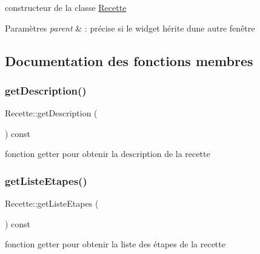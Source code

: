 constructeur de la classe \hyperlink{classRecette}{Recette} 


\begin{DoxyParams}{Paramètres}
{\em parent} & \+: précise si le widget hérite d\textquotesingle{}une autre fenêtre \\
\hline
\end{DoxyParams}


\subsection{Documentation des fonctions membres}
\mbox{\label{classRecette_a7f3746b691f39d1b468b29819ad3c265}} 
\subsubsection{\texorpdfstring{get\+Description()}{getDescription()}}
{\footnotesize\ttfamily Recette\+::get\+Description (\begin{DoxyParamCaption}{ }\end{DoxyParamCaption}) const}



fonction getter pour obtenir la description de la recette 

\mbox{\label{classRecette_a3b2807fe1f55431bcd632bff2332c6e7}} 
\subsubsection{\texorpdfstring{get\+Liste\+Etapes()}{getListeEtapes()}}
{\footnotesize\ttfamily Recette\+::get\+Liste\+Etapes (\begin{DoxyParamCaption}{ }\end{DoxyParamCaption}) const}



fonction getter pour obtenir la liste des étapes de la recette 

\mbox{\label{classRecette_a3ca29579050212dea9da71e9c1f05119}} 
